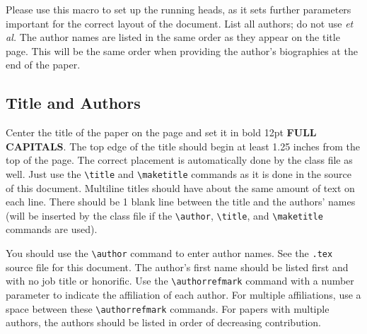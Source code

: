 \documentclass{scspaperproc}
\theoremstyle{scsthe}
\begin{document}
Please use this macro to set up the running heads, as it sets further parameters important for the correct layout of the document. List all authors; do not use \textit{et al.} The author names are listed in the same order as they appear on the title page. This will be the same order when providing the author's biographies at the end of the paper.


\subsection{Title and Authors}

Center the title of the paper on the page and set it in bold 12pt \textbf{\uppercase{full capitals}}. The top edge of the title should begin at least 1.25 inches from the top of the page. The correct placement is automatically done by the class file as well. Just use the \verb+\title+ and \verb+\maketitle+ commands as it is done in the source of this document. Multiline titles should have about the same amount of text on each line. There should be 1 blank line between the title and the authors’ names (will be inserted by the class file if the \verb+\author+, \verb+\title+, and \verb+\maketitle+ commands are used).


You should use the \verb+\author+ command to enter author names. See the \texttt{.tex} source file for this document. The author’s first name should be listed first and with no job title or honorific. Use the \verb+\authorrefmark+ command with a number parameter to indicate the affiliation of each author. For multiple affiliations, use a space between these \verb+\authorrefmark+ commands. For papers with multiple authors, the authors should be listed in order of decreasing contribution.
\end{document}
